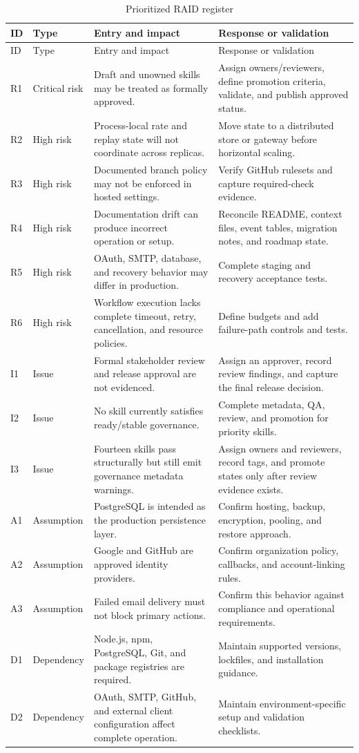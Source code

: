 \documentclass[12pt]{report}
\begin{document}
\begin{longtable}{p{}p{}p{}p{}}
\caption{Prioritized RAID register}\label{tab:raid}\\
\toprule
ID & Type & Entry and impact & Response or validation \\
\midrule
\endfirsthead
\toprule
ID & Type & Entry and impact & Response or validation \\
\midrule
\endhead
R1 & Critical risk & Draft and unowned skills may be treated as formally approved. & Assign owners/reviewers, define promotion criteria, validate, and publish approved status. \\
R2 & High risk & Process-local rate and replay state will not coordinate across replicas. & Move state to a distributed store or gateway before horizontal scaling. \\
R3 & High risk & Documented branch policy may not be enforced in hosted settings. & Verify GitHub rulesets and capture required-check evidence. \\
R4 & High risk & Documentation drift can produce incorrect operation or setup. & Reconcile README, context files, event tables, migration notes, and roadmap state. \\
R5 & High risk & OAuth, SMTP, database, and recovery behavior may differ in production. & Complete staging and recovery acceptance tests. \\
R6 & High risk & Workflow execution lacks complete timeout, retry, cancellation, and resource policies. & Define budgets and add failure-path controls and tests. \\
I1 & Issue & Formal stakeholder review and release approval are not evidenced. & Assign an approver, record review findings, and capture the final release decision. \\
I2 & Issue & No skill currently satisfies ready/stable governance. & Complete metadata, QA, review, and promotion for priority skills. \\
I3 & Issue & Fourteen skills pass structurally but still emit governance metadata warnings. & Assign owners and reviewers, record tags, and promote states only after review evidence exists. \\
A1 & Assumption & PostgreSQL is intended as the production persistence layer. & Confirm hosting, backup, encryption, pooling, and restore approach. \\
A2 & Assumption & Google and GitHub are approved identity providers. & Confirm organization policy, callbacks, and account-linking rules. \\
A3 & Assumption & Failed email delivery must not block primary actions. & Confirm this behavior against compliance and operational requirements. \\
D1 & Dependency & Node.js, npm, PostgreSQL, Git, and package registries are required. & Maintain supported versions, lockfiles, and installation guidance. \\
D2 & Dependency & OAuth, SMTP, GitHub, and external client configuration affect complete operation. & Maintain environment-specific setup and validation checklists. \\
\bottomrule
\end{longtable}
\end{document}
